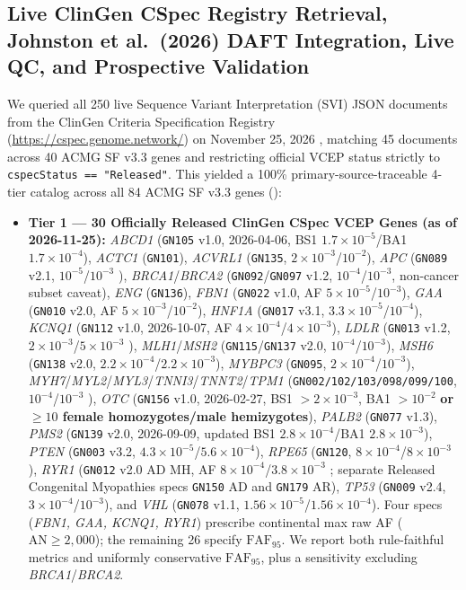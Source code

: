 \documentclass[11pt,letterpaper]{article}
\begin{document}
\subsection{Live ClinGen CSpec Registry Retrieval, Johnston et al.\ (2026) DAFT Integration, Live QC, and Prospective Validation}
We queried all 250 live Sequence Variant Interpretation (SVI) JSON documents from the ClinGen Criteria Specification Registry (\url{https://cspec.genome.network/}) on November 25, 2026 \citep{clingencspec2026}, matching 45 documents across 40 ACMG SF v3.3 genes and restricting official VCEP status strictly to \texttt{cspecStatus == "Released"}. This yielded a 100\% primary-source-traceable 4-tier catalog across all 84 ACMG SF v3.3 genes ():
\begin{itemize}
  \item \textbf{Tier 1 --- 30 Officially Released ClinGen CSpec VCEP Genes (as of 2026-11-25):} \textit{ABCD1} (\texttt{GN105} v1.0, 2026-04-06, BS1 $1.7\times 10^{-5}$/BA1 $1.7\times 10^{-4}$), \textit{ACTC1} (\texttt{GN101}), \textit{ACVRL1} (\texttt{GN135}, $2\times 10^{-3}$/$10^{-2}$), \textit{APC} (\texttt{GN089} v2.1, $10^{-5}$/$10^{-3}$ \citep{spier2024apc}), \textit{BRCA1}/\textit{BRCA2} (\texttt{GN092}/\texttt{GN097} v1.2, $10^{-4}$/$10^{-3}$, non-cancer subset caveat), \textit{ENG} (\texttt{GN136}), \textit{FBN1} (\texttt{GN022} v1.0, AF $5\times 10^{-5}$/$10^{-3}$), \textit{GAA} (\texttt{GN010} v2.0, AF $5\times 10^{-3}$/$10^{-2}$), \textit{HNF1A} (\texttt{GN017} v3.1, $3.3\times 10^{-5}$/$10^{-4}$), \textit{KCNQ1} (\texttt{GN112} v1.0, 2026-10-07, AF $4\times 10^{-4}$/$4\times 10^{-3}$), \textit{LDLR} (\texttt{GN013} v1.2, $2\times 10^{-3}$/$5\times 10^{-3}$ \citep{chora2022ldlr}), \textit{MLH1}/\textit{MSH2} (\texttt{GN115}/\texttt{GN137} v2.0, $10^{-4}$/$10^{-3}$), \textit{MSH6} (\texttt{GN138} v2.0, $2.2\times 10^{-4}$/$2.2\times 10^{-3}$), \textit{MYBPC3} (\texttt{GN095}, $2\times 10^{-4}$/$10^{-3}$), \textit{MYH7}/\textit{MYL2}/\textit{MYL3}/\textit{TNNI3}/\textit{TNNT2}/\textit{TPM1} (\texttt{GN002/102/103/098/099/100}, $10^{-4}$/$10^{-3}$ \citep{kelly2018myh7}), \textit{OTC} (\texttt{GN156} v1.0, 2026-02-27, BS1 $>2\times 10^{-3}$, BA1 $>10^{-2}$ \textbf{or $\ge 10$ female homozygotes/male hemizygotes}), \textit{PALB2} (\texttt{GN077} v1.3), \textit{PMS2} (\texttt{GN139} v2.0, 2026-09-09, updated BS1 $2.8\times 10^{-4}$/BA1 $2.8\times 10^{-3}$), \textit{PTEN} (\texttt{GN003} v3.2, $4.3\times 10^{-5}$/$5.6\times 10^{-4}$), \textit{RPE65} (\texttt{GN120}, $8\times 10^{-4}$/$8\times 10^{-3}$), \textit{RYR1} (\texttt{GN012} v2.0 AD MH, AF $8\times 10^{-4}$/$3.8\times 10^{-3}$ \citep{johnston2021ryr1}; separate Released Congenital Myopathies specs \texttt{GN150} AD and \texttt{GN179} AR), \textit{TP53} (\texttt{GN009} v2.4, $3\times 10^{-4}$/$10^{-3}$), and \textit{VHL} (\texttt{GN078} v1.1, $1.56\times 10^{-5}$/$1.56\times 10^{-4}$). Four specs (\textit{FBN1, GAA, KCNQ1, RYR1}) prescribe continental max raw AF ($\mathrm{AN}\ge 2,000$); the remaining 26 specify $\mathrm{FAF}_{95}$. We report both rule-faithful metrics and uniformly conservative $\mathrm{FAF}_{95}$, plus a sensitivity excluding \textit{BRCA1}/\textit{BRCA2}.

\end{itemize}
\end{document}
